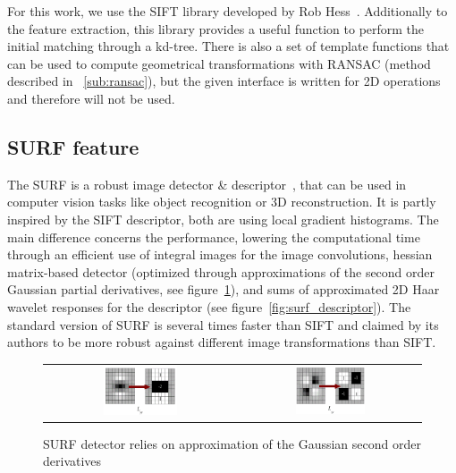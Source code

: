 For this work, we use the \gls{SIFT} library developed by Rob Hess~\cite{hess_sift}. Additionally to the feature extraction, this library provides a useful function to perform the initial matching through a kd-tree. There is also a set of template functions that can be used to compute geometrical transformations with \gls{RANSAC} (method described in ~\ref{sub:ransac}), but the given interface is written for 2D operations and therefore will not be used.

\subsection{SURF feature}

The \gls{SURF} is a robust image detector \& descriptor~\cite{surf}, that can be used in computer vision tasks like object recognition or 3D reconstruction. It is partly inspired by the \gls{SIFT} descriptor, both are using local gradient histograms. The main difference concerns the performance, lowering the computational time through an efficient use of integral images for the image convolutions, hessian matrix-based detector (optimized through approximations of the second order Gaussian partial derivatives, see figure~\ref{fig:surf_detector}), and sums of approximated 2D Haar wavelet responses for the descriptor (see figure~\ref{fig:surf_descriptor}). The standard version of \gls{SURF} is several times faster than \gls{SIFT} and claimed by its authors to be more robust against different image transformations than \gls{SIFT}.

\begin{figure}[H]
\centering
 \begin{tabular}{cc}
 \includegraphics[width=0.4\textwidth]{figures/surf_lyy} &
 \includegraphics[width=0.4\textwidth]{figures/surf_lxy}
 \end{tabular}
\caption{SURF detector relies on approximation of the Gaussian second order derivatives}
\label{fig:surf_detector}
\end{figure}

